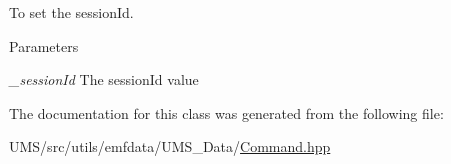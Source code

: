 To set the sessionId. 


\begin{DoxyParams}{Parameters}
\item[{\em \_\-sessionId}]The sessionId value \end{DoxyParams}


The documentation for this class was generated from the following file:\begin{DoxyCompactItemize}
\item 
UMS/src/utils/emfdata/UMS\_\-Data/\hyperlink{Command_8hpp}{Command.hpp}\end{DoxyCompactItemize}
